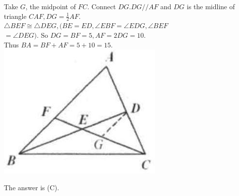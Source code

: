 \documentclass{article}
\begin{document}
Take \(G\), the midpoint of \(F C\). Connect \(D G . D G / / A F\) and \(D G\) is the midline of triangle \(C A F, D G=\frac{1}{2} A F\).\\
\(\triangle B E F \cong \triangle D E G,(B E=E D, \angle E B F=\angle E D G, \angle B E F\)\\
\(=\angle D E G)\). So \(D G=B F=5, A F=2 D G=10\).\\
Thus \(B A=B F+A F=5+10=15\).\\
\centering
\includegraphics[width=\textwidth]{images/reasoning_image_1.jpg}

The answer is (C).\\
\end{document}

